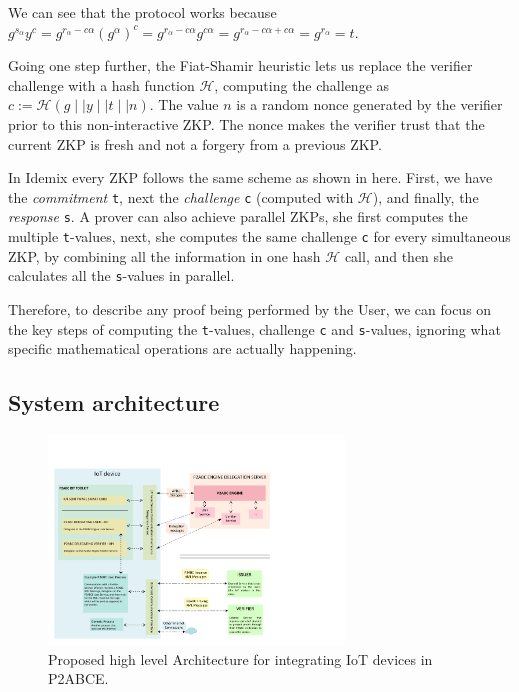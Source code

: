 We can see that the protocol works because $ g^{s_\alpha} y^c = g^{r_\alpha - c\alpha} (g^\alpha)^c =  g^{r_\alpha - c\alpha} g^{c\alpha} =
g^{r_\alpha - c\alpha + c\alpha} = g^{r_\alpha} = t $.

Going one step further, the Fiat-Shamir heuristic lets us replace the verifier challenge with a hash function $\mathcal{H}$, computing the challenge as $c:=\mathcal{H}(g\mid\mid y\mid \mid t\mid\mid n)$. The value $n$ is a random nonce generated by the verifier prior to this non-interactive ZKP. The nonce makes the verifier trust that the current ZKP is fresh and not a forgery from a previous ZKP.

In Idemix every ZKP follows the same scheme as shown in here. First, we have the \textit{commitment} \texttt{t}, next the \textit{challenge} \texttt{c} (computed with $\mathcal{H}$), and finally, the \textit{response} \texttt{s}. A prover can also achieve parallel ZKPs, she first computes the multiple \texttt{t}-values, next, she computes the same challenge \texttt{c} for every simultaneous ZKP, by combining all the information in one hash $\mathcal{H}$ call, and then she calculates all the \texttt{s}-values in parallel.

Therefore, to describe any proof being performed by the User, we can focus on the key steps of computing the \texttt{t}-values, challenge \texttt{c} and \texttt{s}-values, ignoring what specific mathematical operations are actually happening.


\subsection{System architecture}


\begin{figure}[htb!]
	\centering
	\includegraphics[width=0.7\textwidth]{gfx/P2ABCE-IoT-color}
	\caption{Proposed high level Architecture for integrating IoT devices in P2ABCE.}
	\label{fig:P2ABCE-IoT}
\end{figure}

